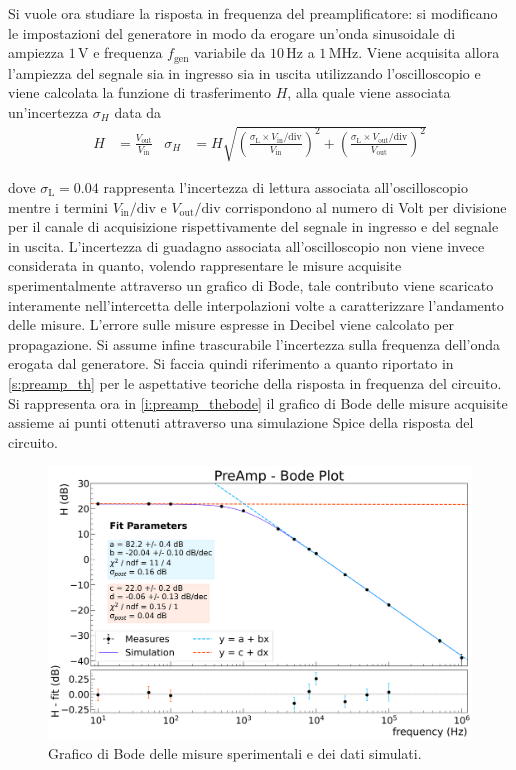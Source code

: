 \documentclass[a4paper,11pt]{article} %
\begin{document}
Si vuole ora studiare la risposta in frequenza del preamplificatore: si modificano le impostazioni del generatore in
modo da erogare un'onda sinusoidale di ampiezza $1\,\si{\volt}$ e frequenza $f_{\text{gen}}$ variabile da $10\,\si{\Hz}$
a $1\,\si{\MHz}$. Viene acquisita allora l'ampiezza del segnale sia in ingresso sia in uscita utilizzando
l'oscilloscopio e viene calcolata la funzione di trasferimento $H$, alla quale viene associata un'incertezza
$\sigma_{H}$ data da
\begin{align}\label{e:preamp_H_err}
	H&=\frac{V_{\text{out}}}{V_{\text{in}}} & 
	\sigma_{H}&= H \sqrt{	
						\left(	\frac{	\sigma_{\text{L}}\times V_{\text{in}}/\text{div}	}{	V_{\text{in}}	}	\right)^2	 + 
						\left(	\frac{	\sigma_{\text{L}}\times V_{\text{out}}/\text{div}	}{	V_{\text{out}}	}	\right)^2 }
\end{align}

dove $\sigma_{\text{L}}=0.04$ rappresenta l'incertezza di lettura associata all'oscilloscopio mentre i termini
$V_{\text{in}}/\text{div}$ e $V_{\text{out}}/\text{div}$ corrispondono al numero di Volt per divisione per il canale di
acquisizione rispettivamente del segnale in ingresso e del segnale in uscita. L'incertezza di guadagno associata
all'oscilloscopio non viene invece considerata in quanto, volendo rappresentare le misure acquisite sperimentalmente
attraverso un grafico di Bode, tale contributo viene scaricato interamente nell'intercetta delle interpolazioni volte a
caratterizzare l'andamento delle misure. L'errore sulle misure espresse in Decibel viene calcolato per propagazione. Si
assume infine trascurabile l'incertezza sulla frequenza dell'onda erogata dal generatore. Si faccia quindi riferimento a
quanto riportato in \autoref{s:preamp_th} per le aspettative teoriche della risposta in frequenza del circuito. Si
rappresenta ora in \autoref{i:preamp_thebode} il grafico di Bode delle misure acquisite assieme ai punti ottenuti
attraverso una simulazione Spice della risposta del circuito.

\begin{figure}[H]
	\centering
	\includegraphics[width=0.9\linewidth]{../Plots/PreAmp/bode_plot.png}
	\caption{\small Grafico di Bode delle misure sperimentali e dei dati simulati.}
	\label{i:preamp_thebode}
\end{figure}
\end{document}

